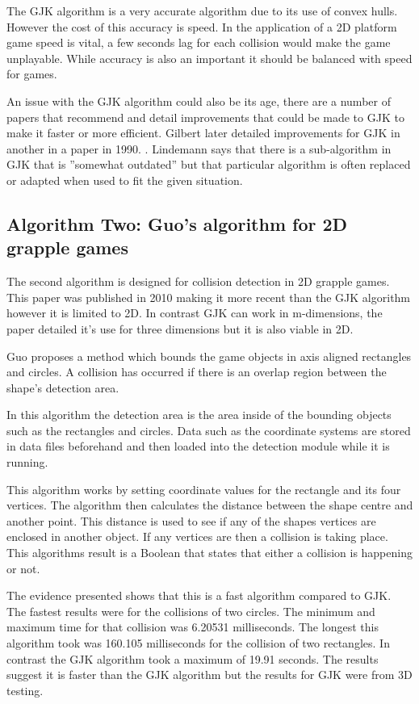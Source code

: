 \documentclass{scrartcl}
\begin{document}
The GJK algorithm is a very accurate algorithm due to its use of convex hulls. However the cost of this accuracy is speed. In the application of a 2D platform game speed is vital, a few seconds lag for each collision would make the game unplayable. While accuracy is also an important it should be balanced with speed for games.

An issue with the GJK algorithm could also be its age, there are a number of papers that recommend and detail improvements that could be made to GJK to make it faster or more efficient. Gilbert later detailed improvements for GJK in another in a paper in 1990. \cite{Gilbert2}.  Lindemann says that there is a sub-algorithm in GJK that is ''somewhat outdated'' \cite{lindemanngjk} but that particular algorithm is often replaced or adapted when used to fit the given situation.
	
\subsection{Algorithm Two: Guo's algorithm for 2D grapple games}
The second algorithm is designed for collision detection in 2D grapple games. This paper was published in 2010 making it more recent than the GJK algorithm however it is limited to 2D. In contrast GJK can work in m-dimensions, the paper detailed it’s use for three dimensions but it is also viable in 2D.  
	
Guo \cite{Guo} proposes a method which bounds the game objects in axis aligned rectangles and circles. A collision has occurred if there is an overlap region between the shape's detection area.
	
In this algorithm the detection area is the area inside of the bounding objects such as the rectangles and circles.  Data such as the coordinate systems are stored in data files beforehand and then loaded into the detection module while it is running.
	
This algorithm works by setting coordinate values for the rectangle and its four vertices.  The algorithm then calculates the distance between the shape centre and another point. This distance is used to see if any of the shapes vertices are enclosed in another object. If any vertices are then a collision is taking place. This algorithms result is a Boolean that states that either a collision is happening or not.
	
The evidence presented shows that this is a fast algorithm compared to GJK. The fastest results were for the collisions of two circles. The minimum and maximum time for that collision was 6.20531 milliseconds. The longest this algorithm took  was 160.105 milliseconds for the collision of two rectangles.  In contrast the GJK algorithm took a maximum of 19.91 seconds.  The results suggest it is faster than the GJK algorithm but the results for GJK were from 3D testing.
	
\end{document}
